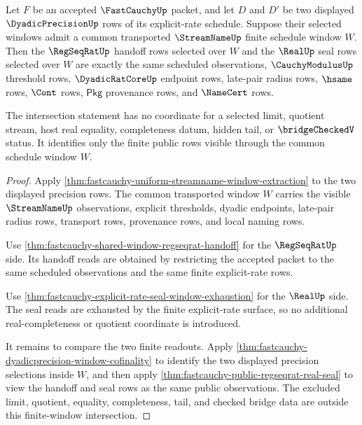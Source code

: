 \begin{theorem}
\label{thm:fastcauchy-streamname-regseqrat-real-window-intersection}
Let $F$ be an accepted $\FastCauchyUp$ packet, and let $D$ and $D'$ be two
displayed $\DyadicPrecisionUp$ rows of its explicit-rate schedule. Suppose
their selected windows admit a common transported $\StreamNameUp$ finite
schedule window $W$. Then the $\RegSeqRatUp$ handoff rows selected over $W$
and the $\RealUp$ seal rows selected over $W$ are exactly the same scheduled
observations, $\CauchyModulusUp$ threshold rows, $\DyadicRatCoreUp$ endpoint
rows, late-pair radius rows, $\hsame$ rows, $\Cont$ rows, $\mathsf{Pkg}$
provenance rows, and $\NameCert$ rows.

The intersection statement has no coordinate for a selected limit, quotient
stream, host real equality, completeness datum, hidden tail, or
$\bridgeCheckedV$ status. It identifies only the finite public rows visible
through the common schedule window $W$.
\end{theorem}
\begin{proof}
Apply \autoref{thm:fastcauchy-uniform-streamname-window-extraction} to the
two displayed precision rows. The common transported window $W$ carries the
visible $\StreamNameUp$ observations, explicit thresholds, dyadic endpoints,
late-pair radius rows, transport rows, provenance rows, and local naming rows.

Use \autoref{thm:fastcauchy-shared-window-regseqrat-handoff} for the
$\RegSeqRatUp$ side. Its handoff reads are obtained by restricting the
accepted packet to the same scheduled observations and the same finite
explicit-rate rows.

Use \autoref{thm:fastcauchy-explicit-rate-seal-window-exhaustion} for the
$\RealUp$ side. The seal reads are exhausted by the finite explicit-rate
surface, so no additional real-completeness or quotient coordinate is
introduced.

It remains to compare the two finite readouts. Apply
\autoref{thm:fastcauchy-dyadicprecision-window-cofinality} to identify the
two displayed precision selections inside $W$, and then apply
\autoref{thm:fastcauchy-public-regseqrat-real-seal} to view the handoff and
seal rows as the same public observations. The excluded limit, quotient,
equality, completeness, tail, and checked bridge data are outside this
finite-window intersection.
\end{proof}

